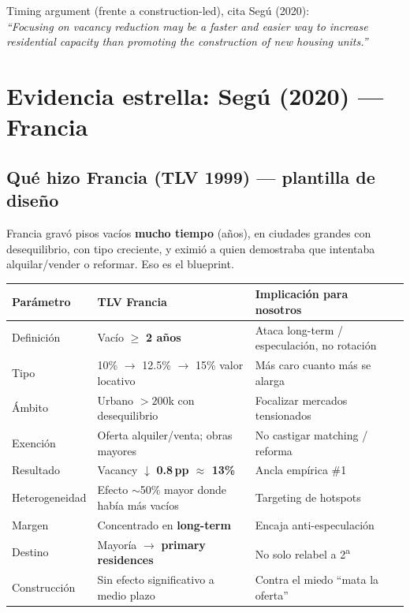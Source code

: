 \documentclass[11pt,a4paper]{report}
\begin{document}
\begin{dato}
Timing argument (frente a construction-led), cita Seg\'u (2020):\\[0.3em]
\emph{``Focusing on vacancy reduction may be a faster and easier way to increase
residential capacity than promoting the construction of new housing units.''}
\end{dato}

\chapter{Evidencia estrella: Seg\'u (2020) --- Francia}
\label{ch:segu}

\section{Qu\'e hizo Francia (TLV 1999) --- plantilla de dise\~no}

\begin{intuicion}
Francia grav\'o pisos vac\'ios \textbf{mucho tiempo} (años), en ciudades grandes
con desequilibrio, con tipo creciente, y eximi\'o a quien demostraba que
intentaba alquilar/vender o reformar. Eso es el blueprint.
\end{intuicion}

\begin{center}
\renewcommand{\arraystretch}{1.2}
\begin{tabularx}{\textwidth}{@{}llX@{}}
\toprule
\textbf{Par\'ametro} & \textbf{TLV Francia} & \textbf{Implicaci\'on para nosotros} \\
\midrule
Definici\'on & Vac\'io $\ge$ \textbf{2 a\~nos} & Ataca long-term / especulaci\'on, no rotaci\'on \\
Tipo & 10\% $\rightarrow$ 12.5\% $\rightarrow$ 15\% valor locativo & M\'as caro cuanto m\'as se alarga \\
\'Ambito & Urbano $>200$k con desequilibrio & Focalizar mercados tensionados \\
Exenci\'on & Oferta alquiler/venta; obras mayores & No castigar matching / reforma \\
Resultado & Vacancy $\downarrow$ \textbf{0.8\,pp $\approx$ 13\%} & Ancla emp\'irica \#1 \\
Heterogeneidad & Efecto $\sim$50\% mayor donde hab\'ia m\'as vac\'ios & Targeting de hotspots \\
Margen & Concentrado en \textbf{long-term} & Encaja anti-especulaci\'on \\
Destino & Mayor\'ia $\rightarrow$ \textbf{primary residences} & No solo relabel a 2\textsuperscript{a} \\
Construcci\'on & Sin efecto significativo a medio plazo & Contra el miedo ``mata la oferta'' \\
\bottomrule
\end{tabularx}
\end{center}
\end{document}

